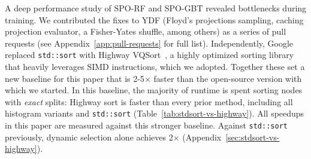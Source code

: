 \documentclass[sigconf,anonymous,review]{acmart}
\begin{document}

A deep performance study of SPO-RF and SPO-GBT revealed bottlenecks during training. We contributed the fixes to YDF (Floyd's projections sampling, caching projection evaluator, a Fisher-Yates shuffle, among others) as a series of pull requests (see Appendix~\ref{app:pull-requests} for full list). Independently, Google replaced \texttt{std::sort} with Highway VQSort~\cite{wassenberg_vectorized_2022}, a highly optimized sorting library that heavily leverages SIMD instructions, which we adopted. Together these set a new baseline for this paper that is 2-5$\times$ faster than the open-source version with which we started. In this baseline, the majority of runtime is spent sorting nodes with {\em exact} splits: Highway sort is faster than every prior method, including all histogram variants and \texttt{std::sort} (Table~\ref{tab:stdsort-vs-highway}). All speedups in this paper are measured against this stronger baseline. Against \texttt{std::sort} previously, dynamic selection alone achieves 2$\times$ (Appendix~\ref{sec:stdsort-vs-highway}). %
\end{document}
